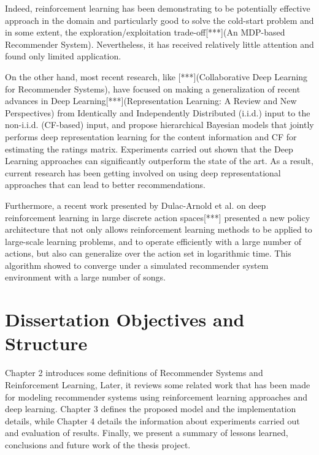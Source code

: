 Indeed, reinforcement learning has been demonstrating to be potentially effective approach in the domain and particularly good to solve the cold-start problem and in some extent, the exploration/exploitation trade-off[***](An MDP-based Recommender System). Nevertheless, it has received relatively little attention and found only limited application.

On the other hand, most recent research, like [***](Collaborative Deep Learning for Recommender Systems), have focused on making a generalization of recent advances in Deep Learning[***](Representation Learning: A Review and New Perspectives) from Identically and Independently Distributed (i.i.d.) input to the non-i.i.d. (CF-based) input, and propose hierarchical Bayesian models that jointly performs deep representation learning for the content information and CF for estimating the ratings matrix. Experiments carried out shown that the Deep Learning approaches can significantly outperform the state of the art. As a result, current research has been getting involved on using deep representational approaches that can lead to better recommendations.

Furthermore, a recent work presented by Dulac-Arnold et al. on deep reinforcement learning in large discrete action spaces[***] presented a new policy architecture that not only allows reinforcement learning methods to be applied to large-scale learning problems, and to operate efficiently with a large number of actions, but also can generalize over the action set in logarithmic time. This algorithm showed to converge under a simulated recommender system environment with a large number of songs.

\section{Dissertation Objectives and Structure}

Chapter 2 introduces some definitions of Recommender Systems and Reinforcement Learning, Later, it reviews some related work that has been made for modeling recommender systems using reinforcement learning approaches and deep learning. Chapter 3 defines the proposed model and the implementation details, while Chapter 4 details the information about experiments carried out and evaluation of results. Finally, we present a summary of lessons learned, conclusions and future work of the thesis project.



